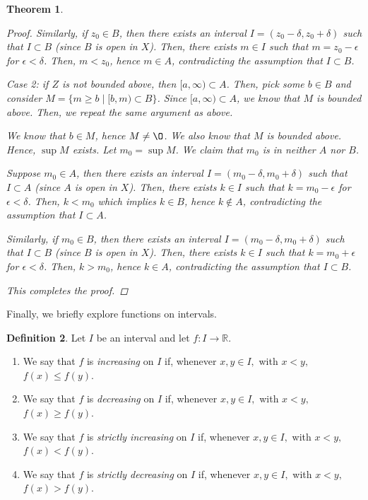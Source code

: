 \documentclass[11pt]{article}
\newcommand{\bbR}{\mathbb{R}}
\renewcommand{\emptyset}{\O}
\newtheorem{theorem}{Theorem}[section]
\theoremstyle{definition}
\newtheorem{definition}[theorem]{Definition}
\numberwithin{equation}{section}
\begin{document}
\begin{theorem}
\begin{proof}
Similarly, if $z_0 \in B$, then there exists an interval $I=(z_0-\delta, z_0+\delta)$ such that $I \subset B$ (since $B$ is open in $X$). Then, there exists $m \in I$ such that $m=z_0-\epsilon$ for $\epsilon<\delta$. Then, $m<z_0$, hence  $m \in A$, contradicting the assumption that $I \subset B$.

Case 2: if $Z$ is not bounded above, then $[a,\infty) \subset A$. Then, pick some $b \in B$ and consider $M = \{m \geq b \mid [b,m) \subset B\}$. Since $[a,\infty) \subset A$, we know that $M$ is bounded above. Then, we repeat the same argument as above. 

We know that $b \in M$, hence $M \neq \emptyset$. We also know that $M$ is bounded above. Hence, $\sup M$ exists. Let $m_0 = \sup M$. We claim that $m_0$ is in neither $A$ nor $B$.

Suppose $m_0 \in A$, then there exists an interval $I=(m_0-\delta, m_0+\delta)$ such that $I \subset A$ (since $A$ is open in $X$). Then, there exists $k \in I$ such that $k=m_0-\epsilon$ for $\epsilon<\delta$. Then, $k<m_0$ which implies $k \in B$, hence $k \notin A$, contradicting the assumption that $I \subset A$.

Similarly, if $m_0 \in B$, then there exists an interval $I=(m_0-\delta, m_0+\delta)$ such that $I \subset B$ (since $B$ is open in $X$). Then, there exists $k \in I$ such that $k=m_0+\epsilon$ for $\epsilon<\delta$. Then, $k>m_0$, hence  $k \in A$, contradicting the assumption that $I \subset B$.

This completes the proof.

\renewcommand\qedsymbol{QED}
\end{proof}

\end{theorem}


Finally, we briefly explore functions on intervals. 

\begin{definition}
Let $I$ be an interval and let $f:I\to\bbR.$ 
\begin{enumerate}
\item[a)] We say that $f$ is {\em increasing} on $I$ if, whenever $x,y\in I,$ with $x<y,$ $f(x)\leq f(y).$
\item[b)] We say that $f$ is {\em decreasing} on $I$  if, whenever $x,y\in I,$ with $x<y,$ $f(x)\geq f(y).$
\item[c)] We say that $f$ is {\em strictly increasing} on $I$ if, whenever $x,y\in I,$ with $x<y,$ $f(x)< f(y).$
\item[d)] We say that $f$ is {\em strictly decreasing} on $I$  if, whenever $x,y\in I,$ with $x<y,$ $f(x)> f(y).$
\end{enumerate}
\end{definition}
\end{document}
